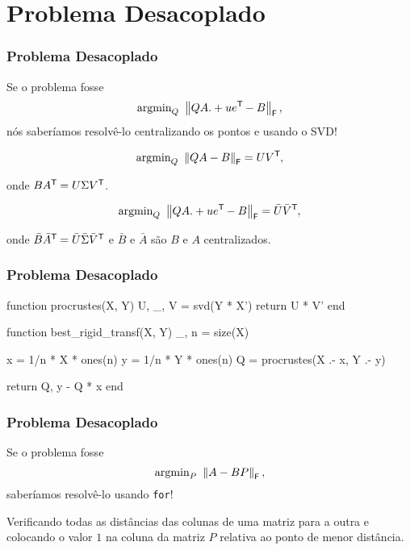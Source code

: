 
\section{Problema Desacoplado}

\begin{frame}[fragile]
  \frametitle{Problema Desacoplado}

  \begin{center}
    Se o problema fosse \[\text{argmin}_{Q}\,\, \left\lVert QA .+ u e^{\mathsf{T}\mkern-1mu} - B\right\rVert_\mathsf{F},\] nós saberíamos resolvê-lo centralizando os pontos e usando o SVD!

  \pause

  \[\text{argmin}_{Q}\,\, \left\lVert QA - B\right\rVert_\mathsf{F} = U V^{\mathsf{T}\mkern-1mu},\]

  onde $B A^{\mathsf{T}\mkern-1mu} = U \Sigma V^{\mathsf{T}\mkern-1mu}$.

  \pause

  \[\text{argmin}_{Q}\,\, \left\lVert QA .+ u e^{\mathsf{T}\mkern-1mu} - B\right\rVert_\mathsf{F} = \bar{U} \bar{V}^{\mathsf{T}\mkern-1mu},\]

  onde $\bar{B} \bar{A}^{\mathsf{T}\mkern-1mu} = \bar{U} \bar{\Sigma} \bar{V}^{\mathsf{T}\mkern-1mu}$ e $\bar{B}$ e $\bar{A}$ são $B$ e $A$ centralizados.
  \end{center}
\end{frame}

\begin{frame}[fragile]
  \frametitle{Problema Desacoplado}
  \begin{code}
    function procrustes(X, Y)
      U, _, V = svd(Y * X')
      return U * V'
    end
  \end{code}
  \pause
  \begin{code}
    function best_rigid_transf(X, Y)
      _, n = size(X)

      x = 1/n * X * ones(n)
      y = 1/n * Y * ones(n)
      Q = procrustes(X .- x, Y .- y)

      return Q, y - Q * x
    end
  \end{code}
\end{frame}

\begin{frame}[fragile]
  \frametitle{Problema Desacoplado}

  \begin{center}
    Se o problema fosse \[\text{argmin}_{P}\,\, \left\lVert A - BP\right\rVert_\mathsf{F},\] saberíamos resolvê-lo usando \texttt{for}!

    \pause
    \vspace{1cm}
    Verificando todas as distâncias das colunas de uma matriz para a outra e colocando o valor $1$ na coluna da matriz $P$ relativa ao ponto de menor distância.
  \end{center}
\end{frame}

